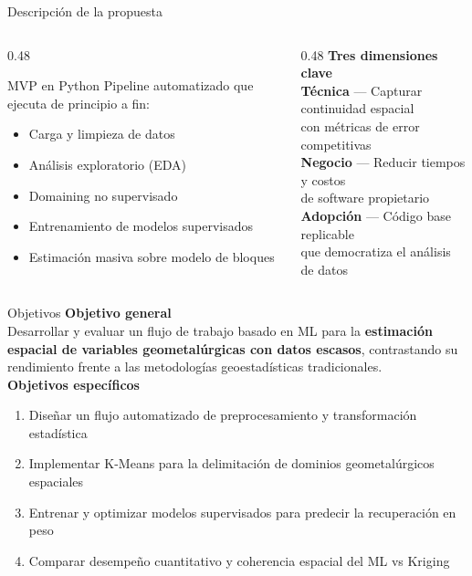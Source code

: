 \documentclass[10pt, aspectratio=169]{beamer}
\newcommand{\hl}[1]{\textcolor{accent}{\textbf{#1}}}
\begin{document}
	\begin{frame}{Descripción de la propuesta}
		\begin{columns}[T]
			\begin{column}{0.48\textwidth}
				\begin{block}{MVP en Python}
					Pipeline automatizado que ejecuta de principio a fin:
					\begin{itemize}
						\item Carga y limpieza de datos
						\item Análisis exploratorio (EDA)
						\item Domaining no supervisado
						\item Entrenamiento de modelos supervisados
						\item Estimación masiva sobre modelo de bloques
					\end{itemize}
				\end{block}
			\end{column}
			\begin{column}{0.48\textwidth}
				\textbf{Tres dimensiones clave}\\[6pt]
				\hl{Técnica} — Capturar continuidad espacial\\
				con métricas de error competitivas\\[8pt]
				\hl{Negocio} — Reducir tiempos y costos\\
				de software propietario\\[8pt]
				\hl{Adopción} — Código base replicable\\
				que democratiza el análisis de datos
			\end{column}
		\end{columns}
	\end{frame}
	
	\begin{frame}{Objetivos}
		\textbf{Objetivo general}\\[4pt]
		Desarrollar y evaluar un flujo de trabajo basado en ML para la
		\hl{estimación espacial de variables geometalúrgicas con datos escasos},
		contrastando su rendimiento frente a las metodologías geoestadísticas
		tradicionales.\\[12pt]
		
		\textbf{Objetivos específicos}
		\begin{enumerate}
			\item Diseñar un flujo automatizado de preprocesamiento y transformación estadística
			\item Implementar K-Means para la delimitación de dominios geometalúrgicos espaciales
			\item Entrenar y optimizar modelos supervisados para predecir la recuperación en peso
			\item Comparar desempeño cuantitativo y coherencia espacial del ML vs Kriging
		\end{enumerate}
	\end{frame}
	
\end{document}
